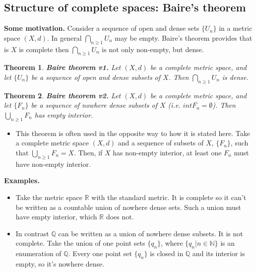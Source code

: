 \documentclass[two column]{article}
\newtheorem{theorem}{Theorem}[subsection]
\begin{document}
\subsection{Structure of complete spaces: Baire's theorem}

{\bf Some motivation.} Consider a sequence of open and dense sets $\{U_{n}\}$ in a metric space $(X,d)$. In general $\bigcap_{n\geq1} U_{n}$ may be empty. Baire's theorem provides that is $X$ is complete then $\bigcap_{n\geq1} U_{n}$ is not only non-empty, but dense. \\

\begin{theorem}
{\bf Baire theorem v1.} Let $(X,d)$ be a complete metric space, and let $\{U_{n}\}$ be a sequence of open and dense subsets of $X$. Then $\bigcap_{n\geq1} U_{n}$ is dense. \\
\end{theorem}

\begin{theorem}
{\bf Baire theorem v2.} Let $(X,d)$ be a complete metric space, and let $\{F_{n}\}$ be a sequence of nowhere dense subsets of $X$ (i.e. $int \overline{F_{n}} = \emptyset$). Then $\bigcup_{n\geq1} F_{n}$ has empty interior. 
\end{theorem}
\begin{itemize}
\item This theorem is often used in the opposite way to how it is stated here. Take a complete metric space $(X,d)$ and a sequence of subsets of $X$, $\{F_{n}\}$, such that $\bigcup_{n\geq1} F_{n} = X$. Then,  if $X$ has non-empty interior, at least one $F_{n}$ must have non-empty interior. \vspace{6pt}
\end{itemize}

{\bf Examples.}
\begin{itemize}
\item Take the metric space $\mathbb{R}$ with the standard metric. It is complete so it can't be written as a countable union of nowhere dense sets. Such a union must have empty interior, which $\mathbb{R}$ does not.
\item  In contrast $\mathbb{Q}$ can be written as a union of nowhere dense subsets. It is not complete. Take the union of one point sets $\{q_{n}\}$, where $\{q_{n} \vert n \in \mathbb{N} \}$  is an enumeration of $\mathbb{Q}$. Every one point set $\{q_{n}\}$ is closed in $\mathbb{Q}$ and its interior is empty, so it's nowhere dense. \vspace{6pt}
\end{itemize}
\end{document}
